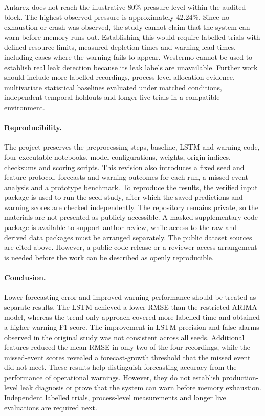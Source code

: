 \documentclass{llncs}
\begin{document}
Antarex does not reach the illustrative 80\% pressure level within the audited block. The highest observed pressure is approximately 42.24\%. Since no exhaustion or crash was observed, the study cannot claim that the system can warn before memory runs out. Establishing this would require labelled trials with defined resource limits, measured depletion times and warning lead times, including cases where the warning fails to appear. Westermo cannot be used to establish real leak detection because its leak labels are unavailable. Further work should include more labelled recordings, process-level allocation evidence, multivariate statistical baselines evaluated under matched conditions, independent temporal holdouts and longer live trials in a compatible environment.

\paragraph{Reproducibility.} The project preserves the preprocessing steps, baseline, LSTM and warning code, four executable notebooks, model configurations, weights, origin indices, checksums and scoring scripts. This revision also introduces a fixed seed and feature protocol, forecasts and warning outcomes for each run, a missed-event analysis and a prototype benchmark. To reproduce the results, the verified input package is used to run the seed study, after which the saved predictions and warning scores are checked independently. The repository remains private, so the materials are not presented as publicly accessible. A masked supplementary code package is available to support author review, while access to the raw and derived data packages must be arranged separately. The public dataset sources are cited above. However, a public code release or a reviewer-access arrangement is needed before the work can be described as openly reproducible.

\begin{samepage}
\paragraph{Conclusion.} Lower forecasting error and improved warning performance should be treated as separate results. The LSTM achieved a lower RMSE than the restricted ARIMA model, whereas the trend-only approach covered more labelled time and obtained a higher warning F1 score. The improvement in LSTM precision and false alarms observed in the original study was not consistent across all seeds. Additional features reduced the mean RMSE in only two of the four recordings, while the missed-event scores revealed a forecast-growth threshold that the missed event did not meet. These results help distinguish forecasting accuracy from the performance of operational warnings. However, they do not establish production-level leak diagnosis or prove that the system can warn before memory exhaustion. Independent labelled trials, process-level measurements and longer live evaluations are required next.
\par\end{samepage}



\end{document}
